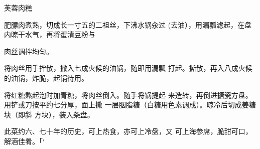 \begin{recipe}{芙蓉肉糕}

\ingredients


\cooking

\step 肥膘肉煮熟，切成长一寸五的二祖丝，下沸水锅汆过 (去油），用漏瓢滤起，在盘内晾干水气，再将蛋清豆粉与

肉丝调拌均匀。

\step 将肉丝用手拌散，撒入七成火候的油锅，随即用漏瓢 打起。撕散，再入八成火候的油锅，炸脆，起锅待用。

\step 将红糖熬起泡时加青糖，将肉丝倒入。随手将锅提起 来造转，再倒进搪瓷方盘。用铲或刀按平约七分厚，面上撒 一层胭脂糖（白糖用色素调成）。晾冷后切成姜糖块（即斜 方块），装入条盘。

\notes

此菜约六、七十年的历史，可上热食，亦可上冷盘，又 可上海参席，脆甜可口，解酒佳肴。「‘

\end{recipe}

